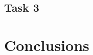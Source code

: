 \documentclass[draft]{llncs}
\begin{document}
\subsection{Task 3}
\label{sub:task3}


\section{Conclusions}





\providecommand{\url}[1]{\texttt{#1}}
\end{document}
